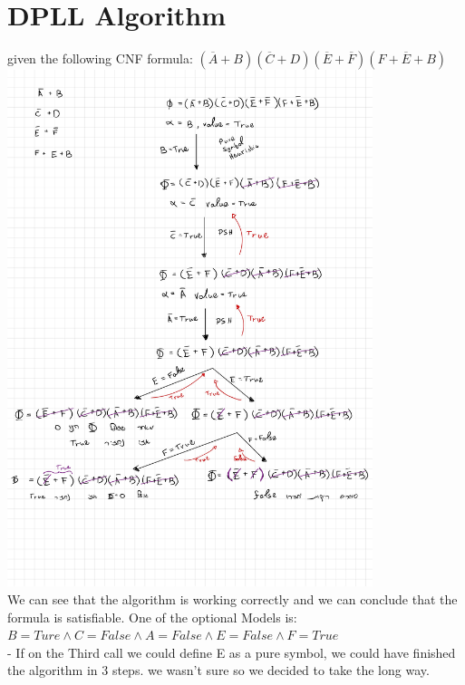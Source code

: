 \documentclass{article}
\begin{document}
\section{DPLL Algorithm}
given the following CNF formula: $(\overline A +B)(\overline C + D)(\overline E + \overline F)(F + \overline E + B)$\\
\includegraphics[width=0.8\textwidth]{DPLL.jpg}\\

We can see that the algorithm is working correctly and we can conclude that the formula is satisfiable.
One of the optional Models is: $B = Ture \land C = False \land A = False \land E = False \land F = True$\\
- If on the Third call we could define E as a pure symbol, we could have finished the algorithm in 3 steps. we wasn't sure so we decided to take the long way.
\end{document}
